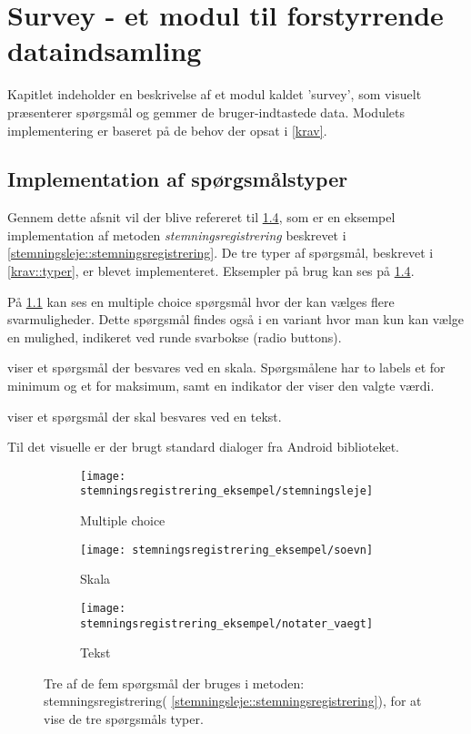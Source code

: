 \chapter{Survey - et modul til forstyrrende dataindsamling}\label{survey}
Kapitlet indeholder en beskrivelse af et modul kaldet 'survey', som visuelt præsenterer spørgsmål og gemmer de bruger-indtastede data.
Modulets implementering er baseret på de behov der opsat i \cref{krav}.

\section{Implementation af spørgsmålstyper}\label{survey:spg}
Gennem dette afsnit vil der blive refereret til \cref{stemreg::spoergsmaal}, som er en eksempel implementation af metoden  \emph{stemningsregistrering} beskrevet i \cref{stemningsleje::stemningsregistrering}.
De tre typer af spørgsmål, beskrevet i \cref{krav::typer}, er blevet implementeret.
Eksempler på brug kan ses på \cref{stemreg::spoergsmaal}.

På \cref{stemreg::stemningsleje} kan ses en multiple choice spørgsmål hvor der kan vælges flere svarmuligheder.
Dette spørgsmål findes også i en variant hvor man kun kan vælge en mulighed, indikeret ved runde svarbokse (radio buttons).

 viser et spørgsmål der besvares ved en skala. 
Spørgsmålene har to labels et for minimum og et for maksimum, samt en indikator der viser den valgte værdi.

 viser et spørgsmål der skal besvares ved en tekst. 

Til det visuelle er der brugt standard dialoger fra Android biblioteket.\cite{android_dialogs}
	
\begin{figure}
	\centering
	\begin{subfigure}[b]{0.45\textwidth}
		\texttt{[image: stemningsregistrering\_eksempel/stemningsleje]}
		\caption{Multiple choice}\label{stemreg::stemningsleje}
	\end{subfigure}
	\hfill
\begin{minipage}[b]{0.45\textwidth}
	\begin{subfigure}[b]{\textwidth}
		\texttt{[image: stemningsregistrering\_eksempel/soevn]}
		\caption{Skala}\label{stemreg::soevn}
	\end{subfigure}
	\newline 
	\begin{subfigure}[b]{\textwidth}
		\texttt{[image: stemningsregistrering\_eksempel/notater\_vaegt]}
		\caption{Tekst}\label{stemreg::notater_vaegt}
	\end{subfigure}	
\end{minipage}	
	\caption{Tre af de fem spørgsmål der bruges i metoden: stemningsregistrering( \cref{stemningsleje::stemningsregistrering}), for at vise de tre spørgsmåls typer.}\label{stemreg::spoergsmaal}
\end{figure}

